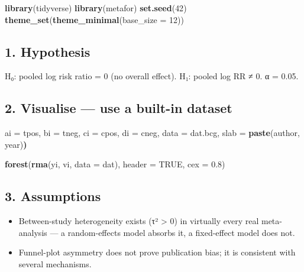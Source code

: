 \documentclass[
]{article}
\newenvironment{Shaded}{\begin{snugshade}}{\end{snugshade}}
\newcommand{\AttributeTok}[1]{\textcolor[rgb]{0.13,0.29,0.53}{#1}}
\newcommand{\ConstantTok}[1]{\textcolor[rgb]{0.56,0.35,0.01}{#1}}
\newcommand{\DecValTok}[1]{\textcolor[rgb]{0.00,0.00,0.81}{#1}}
\newcommand{\ErrorTok}[1]{\textcolor[rgb]{0.64,0.00,0.00}{\textbf{#1}}}
\newcommand{\FloatTok}[1]{\textcolor[rgb]{0.00,0.00,0.81}{#1}}
\newcommand{\FunctionTok}[1]{\textcolor[rgb]{0.13,0.29,0.53}{\textbf{#1}}}
\newcommand{\NormalTok}[1]{#1}
\newcommand{\OtherTok}[1]{\textcolor[rgb]{0.56,0.35,0.01}{#1}}
\providecommand{\tightlist}{%
  \setlength{\itemsep}{0pt}\setlength{\parskip}{0pt}}
\begin{document}
\begin{Shaded}
\begin{Highlighting}[]
\FunctionTok{library}\NormalTok{(tidyverse)}
\FunctionTok{library}\NormalTok{(metafor)}
\FunctionTok{set.seed}\NormalTok{(}\DecValTok{42}\NormalTok{)}
\FunctionTok{theme\_set}\NormalTok{(}\FunctionTok{theme\_minimal}\NormalTok{(}\AttributeTok{base\_size =} \DecValTok{12}\NormalTok{))}
\end{Highlighting}
\end{Shaded}

\subsection{1. Hypothesis}\label{hypothesis}

H₀: pooled log risk ratio = 0 (no overall effect). H₁: pooled log RR ≠
0. α = 0.05.

\subsection{2. Visualise --- use a built-in
dataset}\label{visualise-use-a-built-in-dataset}

\begin{Shaded}
\begin{Highlighting}[]
\NormalTok{              ai }\OtherTok{=}\NormalTok{ tpos, bi }\OtherTok{=}\NormalTok{ tneg, ci }\OtherTok{=}\NormalTok{ cpos, di }\OtherTok{=}\NormalTok{ cneg,}
\NormalTok{              data }\OtherTok{=}\NormalTok{ dat.bcg, slab }\OtherTok{=} \FunctionTok{paste}\NormalTok{(author, year)}\ErrorTok{)}
\end{Highlighting}
\end{Shaded}

\begin{Shaded}
\begin{Highlighting}[]
\FunctionTok{forest}\NormalTok{(}\FunctionTok{rma}\NormalTok{(yi, vi, }\AttributeTok{data =}\NormalTok{ dat), }\AttributeTok{header =} \ConstantTok{TRUE}\NormalTok{, }\AttributeTok{cex =} \FloatTok{0.8}\NormalTok{)}
\end{Highlighting}
\end{Shaded}

\subsection{3. Assumptions}\label{assumptions}

\begin{itemize}
\tightlist
\item
  Between-study heterogeneity exists (τ² \textgreater{} 0) in virtually
  every real meta-analysis --- a random-effects model absorbs it, a
  fixed-effect model does not.
\item
  Funnel-plot asymmetry does not prove publication bias; it is
  consistent with several mechanisms.
\end{itemize}
\end{document}
